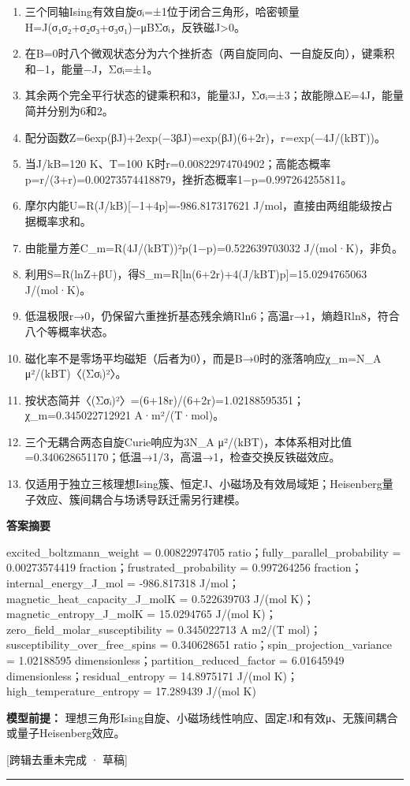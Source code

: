\documentclass[UTF8,11pt,a4paper]{ctexart}
\begin{document}
\begin{enumerate}
\item 三个同轴Ising有效自旋σᵢ=±1位于闭合三角形，哈密顿量H=J(σ₁σ₂+σ₂σ₃+σ₃σ₁)−μBΣσᵢ，反铁磁J>0。
\item 在B=0时八个微观状态分为六个挫折态（两自旋同向、一自旋反向），键乘积和−1，能量−J，Σσᵢ=±1。
\item 其余两个完全平行状态的键乘积和3，能量3J，Σσᵢ=±3；故能隙ΔE=4J，能量简并分别为6和2。
\item 配分函数Z=6exp(βJ)+2exp(−3βJ)=exp(βJ)(6+2r)，r=exp(−4J/(kBT))。
\item 当J/kB=120 K、T=100 K时r=0.00822974704902；高能态概率p=r/(3+r)=0.00273574418879，挫折态概率1−p=0.997264255811。
\item 摩尔内能U=R(J/kB)[−1+4p]=-986.817317621 J/mol，直接由两组能级按占据概率求和。
\item 由能量方差C\_m=R(4J/(kBT))²p(1−p)=0.522639703032 J/(mol·K)，非负。
\item 利用S=R(lnZ+βU)，得S\_m=R[ln(6+2r)+4(J/kBT)p]=15.0294765063 J/(mol·K)。
\item 低温极限r→0，仍保留六重挫折基态残余熵Rln6；高温r→1，熵趋Rln8，符合八个等概率状态。
\item 磁化率不是零场平均磁矩（后者为0），而是B→0时的涨落响应χ\_m=N\_A μ²/(kBT)〈(Σσᵢ)²〉。
\item 按状态简并〈(Σσᵢ)²〉=(6+18r)/(6+2r)=1.02188595351；χ\_m=0.345022712921 A·m²/(T·mol)。
\item 三个无耦合两态自旋Curie响应为3N\_A μ²/(kBT)，本体系相对比值=0.340628651170；低温→1/3，高温→1，检查交换反铁磁效应。
\item 仅适用于独立三核理想Ising簇、恒定J、小磁场及有效局域矩；Heisenberg量子效应、簇间耦合与场诱导跃迁需另行建模。
\end{enumerate}
\noindent\textbf{答案摘要}\par
excited\_boltzmann\_weight = 0.00822974705 ratio；fully\_parallel\_probability = 0.00273574419 fraction；frustrated\_probability = 0.997264256 fraction；internal\_energy\_J\_mol = -986.817318 J/mol；magnetic\_heat\_capacity\_J\_molK = 0.522639703 J/(mol K)；magnetic\_entropy\_J\_molK = 15.0294765 J/(mol K)；zero\_field\_molar\_susceptibility = 0.345022713 A m2/(T mol)；susceptibility\_over\_free\_spins = 0.340628651 ratio；spin\_projection\_variance = 1.02188595 dimensionless；partition\_reduced\_factor = 6.01645949 dimensionless；residual\_entropy = 14.8975171 J/(mol K)；high\_temperature\_entropy = 17.289439 J/(mol K)\par
\noindent\textbf{模型前提：}
理想三角形Ising自旋、小磁场线性响应、固定J和有效μ、无簇间耦合或量子Heisenberg效应。\par
\noindent\textcolor{red!65!black}{[跨辑去重未完成 · 草稿]} \par
\medskip\hrule\medskip
{}
\end{document}
